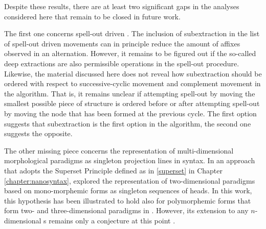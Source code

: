 Despite these results, there are at least two significant gaps in the analyses considered here that remain to be closed in future work.
\par
The first one concerns spell-out driven . The inclusion of subextraction in the list of spell-out driven movements can in principle reduce  the amount of affixes observed in an alternation. However, it remains to be figured out if the so-called deep extractions are also permissible operations in the spell-out procedure. Likewise, the material discussed here does not reveal how subextraction should be ordered with respect to successive-cyclic movement and complement movement in the algorithm.  That is, it remains unclear if attempting spell-out by moving the smallest possible piece of structure is ordered before or after attempting spell-out by moving the node that has been formed at the previous cycle. The first option suggests that subextraction is the first option in the algorithm, the second one suggests the opposite.
\par
The other missing piece concerns the representation of multi-dimensional morphological paradigms as singleton projection lines in syntax. In an approach that adopts the Superset Principle defined as in \ref{superset} in Chapter \ref{chapter:nanosyntax}, \cite{CahaPantcheva2012} explored the representation of two-dimensional paradigms based on mono-morphemic forms as singleton sequences of heads. In this work, this hypothesis has been illustrated to hold also for polymorphemic forms that form two- and three-dimensional paradigms in . However, its extension to any $n$-dimensional s remains only a conjecture at this point .
 
